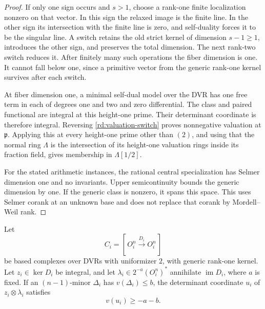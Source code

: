 \begin{proof}
If only one sign occurs and \(s>1\), choose a rank-one finite
localization nonzero on that vector.  In this sign the relaxed
image is the finite line.  In the other sign its intersection
with the finite line is zero, and self-duality forces it to be
the singular line.  A switch retains the old strict kernel of
dimension \(s-1\ge1\), introduces the other sign, and preserves
the total dimension.  The next rank-two switch reduces it.
After finitely many such operations the fiber dimension is one.
It cannot fall below one, since a primitive vector from the
generic rank-one kernel survives after each switch.

At fiber dimension one, a minimal self-dual model over the DVR
has one free term in each of degrees one and two and zero
differential.  The class and paired functional are integral at
this height-one prime.  Their determinant coordinate is
therefore integral.  Reversing
\eqref{rd:valuation-switch} proves nonnegative valuation at
\(\mathfrak p\).  Applying this at every height-one prime other
than \((2)\), and using that the normal ring \(\Lambda\) is the
intersection of its height-one valuation rings inside its fraction
field, gives membership in \(\Lambda[1/2]\).

For the stated arithmetic instances, the rational central
specialization has Selmer dimension one and no invariants.
Upper semicontinuity bounds the generic dimension by one.
If the generic class is nonzero, it spans this space.  This
uses Selmer corank at an unknown base and does not replace that
corank by Mordell--Weil rank.
\end{proof}

\begin{lemma}\label{rd:minor}
Let
\[
 C_i=[\,O_i^n\xrightarrow{D_i}O_i^n\,]
\]
be based complexes over DVRs with uniformizer \(2\), with generic
rank-one kernel.  Let \(z_i\in\ker D_i\) be integral, and let
\(\lambda_i\in 2^{-a}(O_i^n)^*\) annihilate \(\operatorname{im}D_i\),
where \(a\) is fixed.  If an \((n-1)\)-minor \(\Delta_i\) has
\(v(\Delta_i)\le b\), the determinant coordinate \(u_i\) of
\(z_i\otimes\lambda_i\) satisfies
\begin{equation}
 v(u_i)\ge-a-b.
 \label{rd:minor-bound}
\end{equation}
\end{lemma}

